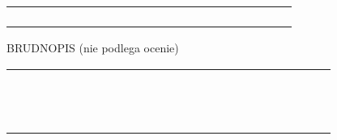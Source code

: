 \documentclass[10pt]{article}
\begin{document}
\begin{center}
\begin{tabular}{|c|c|c|c|c|c|c|c|c|c|c|c|c|c|c|c|c|c|c|c|c|c|}
\hline
 &  &  &  &  &  &  &  &  &  &  &  &  &  &  &  &  &  &  &  &  &  \\
\hline
 &  &  &  &  &  &  &  &  &  &  &  &  &  &  &  &  &  &  &  &  &  \\
\hline
 &  &  &  &  &  &  &  &  &  &  &  &  &  &  &  &  &  &  &  &  &  \\
\hline
 &  &  &  &  &  &  &  &  &  &  &  &  &  &  &  &  &  &  &  &  &  \\
\hline
 &  &  &  &  &  &  &  &  &  &  &  &  &  &  &  &  &  &  &  &  &  \\
\hline
\end{tabular}
\end{center}

BRUDNOPIS (nie podlega ocenie)

\begin{center}
\begin{tabular}{|c|c|c|c|c|c|c|c|c|c|c|c|c|c|c|c|c|c|c|c|c|c|c|c|c|}
\hline
 &  &  &  &  &  &  &  &  &  &  &  &  &  &  &  &  &  &  &  &  &  &  &  &  \\
\hline
 &  &  &  &  &  &  &  &  &  &  &  &  &  &  &  &  &  &  &  &  &  &  &  &  \\
\hline
 &  &  &  &  &  &  &  &  &  &  &  &  &  &  &  &  &  &  &  &  &  &  &  &  \\
\hline
 &  &  &  &  &  &  &  &  &  &  &  &  &  &  &  &  &  &  &  &  &  &  &  &  \\
\hline
 &  &  &  &  &  &  &  &  &  &  &  &  &  &  &  &  &  &  &  &  &  &  &  &  \\
\hline
 &  &  &  &  &  &  &  &  &  &  &  &  &  &  &  &  &  &  &  &  &  &  &  &  \\
\hline
 &  &  &  &  &  &  &  &  &  &  &  &  &  &  &  &  &  &  &  &  &  &  &  &  \\
\hline
 &  &  &  &  &  &  &  &  &  &  &  &  &  &  &  &  &  &  &  &  &  &  &  &  \\
\hline
 &  &  &  &  &  &  &  &  &  &  &  &  &  &  &  &  &  &  &  &  &  &  &  &  \\
\hline
 &  &  &  &  &  &  &  &  &  &  &  &  &  &  &  &  &  &  &  &  &  &  &  &  \\
\hline
 &  &  &  &  &  &  &  &  &  &  &  &  &  &  &  &  &  &  &  &  &  &  &  &  \\
\hline
 &  &  &  &  &  &  &  &  &  &  &  &  &  &  &  &  &  &  &  &  &  &  &  &  \\
\hline
 &  &  &  &  &  &  &  &  &  &  &  &  &  &  &  &  &  &  &  &  &  &  &  &  \\
\hline
 &  &  &  &  &  &  &  &  &  &  &  &  &  &  &  &  &  &  &  &  &  &  &  &  \\

\end{tabular}
\end{center}
\end{document}
